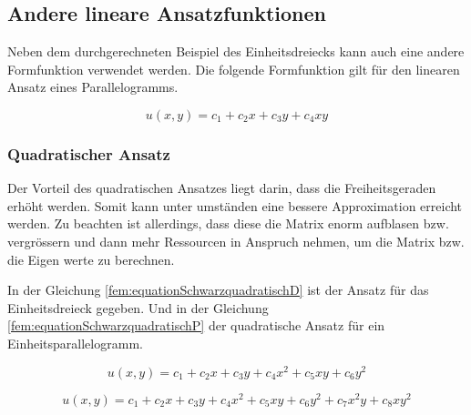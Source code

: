 \subsection{Andere lineare Ansatzfunktionen
\label{fem:subsection:Ansatzfunktionen}}

Neben dem durchgerechneten Beispiel des Einheitsdreiecks kann auch eine andere Formfunktion verwendet werden. Die folgende Formfunktion gilt für den linearen Ansatz eines Parallelogramms.

\begin{equation}
	u(x,y) = c_1 + c_2 x + c_3 y + c_4 xy
\end{equation} 


\subsubsection{Quadratischer Ansatz
\label{fem:subsection:bonorum}}

Der Vorteil des quadratischen Ansatzes liegt darin, dass die Freiheitsgeraden erhöht werden. Somit kann unter umständen eine bessere Approximation erreicht werden.
Zu beachten ist allerdings, dass diese die Matrix enorm aufblasen bzw. vergrössern und dann mehr Ressourcen in Anspruch nehmen, um die Matrix bzw. die Eigen werte zu berechnen.

In der Gleichung \ref{fem:equationSchwarzquadratischD}  ist der Ansatz für das Einheitsdreieck gegeben. Und in der Gleichung \ref{fem:equationSchwarzquadratischP} der quadratische Ansatz für ein Einheitsparallelogramm.

\begin{equation}
	u(x,y) = c_1 + c_2 x + c_3 y + c_4 x^2 + c_5 xy + c_6 y^2
	\label{fem:equationSchwarzquadratischD}
\end{equation}

\begin{equation}
	u(x,y) = c_1 + c_2 x + c_3 y + c_4 x^2 + c_5 xy + c_6 y^2 + c_7 x^2y + c_8 xy^2
	\label{fem:equationSchwarzquadratischP}
\end{equation} 



